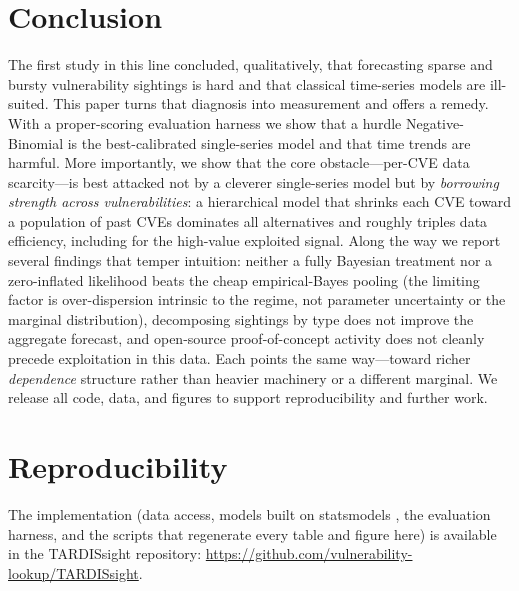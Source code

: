 \documentclass[]{article}
\begin{document}
\section{Conclusion}
The first study in this line concluded, qualitatively, that forecasting sparse and
bursty vulnerability sightings is hard and that classical time-series models are
ill-suited. This paper turns that diagnosis into measurement and offers a remedy.
With a proper-scoring evaluation harness we show that a hurdle Negative-Binomial is
the best-calibrated single-series model and that time trends are harmful. More
importantly, we show that the core obstacle---per-CVE data scarcity---is best
attacked not by a cleverer single-series model but by \emph{borrowing strength
across vulnerabilities}: a hierarchical model that shrinks each CVE toward a
population of past CVEs dominates all alternatives and roughly triples data
efficiency, including for the high-value exploited signal. Along the way we report
several findings that temper intuition: neither a fully Bayesian treatment nor a
zero-inflated likelihood beats the cheap empirical-Bayes pooling (the limiting
factor is over-dispersion intrinsic to the regime, not parameter uncertainty or
the marginal distribution), decomposing sightings by type does not improve the
aggregate forecast, and open-source proof-of-concept activity does not cleanly
precede exploitation in this data. Each points the same way---toward richer
\emph{dependence} structure rather than heavier machinery or a different marginal.
We release all code, data, and figures to support reproducibility and further work.

\section*{Reproducibility}
The implementation (data access, models built on statsmodels
\cite{seabold2010statsmodels}, the evaluation harness, and the scripts that
regenerate every table and figure here) is available in the TARDISsight
repository: \url{https://github.com/vulnerability-lookup/TARDISsight}.

{}

\end{document}

